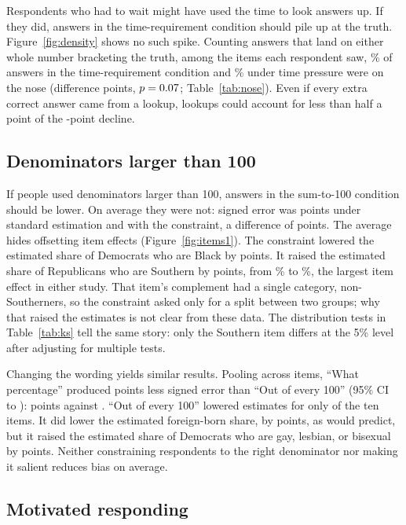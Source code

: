 \documentclass[11pt]{article}
\begin{document}
Respondents who had to wait might have used the time to look answers up. If they did, answers in the time-requirement condition should pile up at the truth. Figure~\ref{fig:density} shows no such spike. Counting answers that land on either whole number bracketing the truth, among the items each respondent saw, \noseSlow\% of answers in the time-requirement condition and \noseFast\% under time pressure were on the nose (difference \noseDiff{} points, $p=0.07$; Table~\ref{tab:nose}). Even if every extra correct answer came from a lookup, lookups could account for less than half a point of the \timeEffect-point decline.

\subsection{Denominators larger than 100}

If people used denominators larger than 100, answers in the sum-to-100 condition should be lower. On average they were not: signed error was \standardBias{} points under standard estimation and \sumBias{} with the constraint, a difference of \sumEffect{} points. The average hides offsetting item effects (Figure~\ref{fig:items1}). The constraint lowered the estimated share of Democrats who are Black by \sumBlackAbs{} points. It raised the estimated share of Republicans who are Southern by \sumSouth{} points, from \standardSouthMean\% to \sumSouthMean\%, the largest item effect in either study. That item's complement had a single category, non-Southerners, so the constraint asked only for a split between two groups; why that raised the estimates is not clear from these data. The distribution tests in Table~\ref{tab:ks} tell the same story: only the Southern item differs at the 5\% level after adjusting for multiple tests.

Changing the wording yields similar results. Pooling across items, ``What percentage'' produced \wordEffect{} points less signed error than ``Out of every 100'' (95\% CI \wordLo{} to \wordHi): \percentBias{} points against \hundredBias. ``Out of every 100'' lowered estimates for only \hundredLowerItems{} of the ten items. It did lower the estimated foreign-born share, by \wordImm{} points, as \citet{sides2007b} would predict, but it raised the estimated share of Democrats who are gay, lesbian, or bisexual by \wordLgb{} points. Neither constraining respondents to the right denominator nor making it salient reduces bias on average.

\subsection{Motivated responding}
\end{document}
